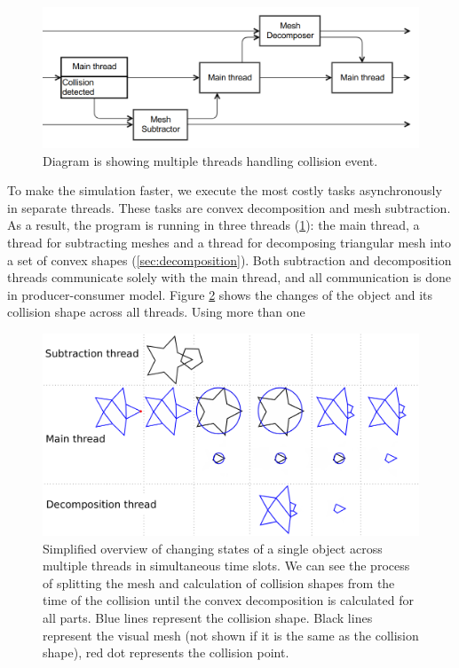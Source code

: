 \begin{figure}
        \centering
        \includegraphics[width=\textwidth]{img/decompositionFlow}
        \caption{Diagram is showing multiple threads handling collision event. }
        \label{fig:threads}
\end{figure}
To make the simulation faster, we execute the most costly tasks asynchronously in separate threads. These tasks are convex decomposition and mesh subtraction. As a result, the program is running in three threads (\cref{fig:threads}): the main thread, a thread for subtracting meshes and a thread for decomposing triangular mesh into a set of convex shapes (\cref{sec:decomposition}). Both subtraction and decomposition threads communicate solely with the main thread, and all communication is done in producer-consumer model. Figure \ref{fig:objectInThreads} shows the changes of the object and its collision shape across all threads. Using more than one 


\begin{figure}
        \centering
        \includegraphics[width=\textwidth]{img/object-progress}
        \caption{Simplified overview of changing states of a single object across multiple threads in simultaneous time slots. We can see the process of splitting the mesh and calculation of collision shapes from the time of the collision until the convex decomposition is calculated for all parts. Blue lines represent the collision shape. Black lines represent the visual mesh (not shown if it is the same as the collision shape), red dot represents the collision point.}
        \label{fig:objectInThreads}
\end{figure}

